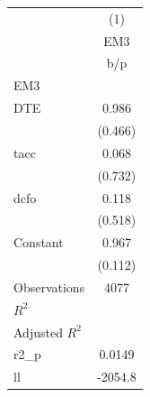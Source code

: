 {
\def\sym#1{\ifmmode^{#1}\else\(^{#1}\)\fi}
\begin{tabular}{l*{1}{c}}
\hline\hline
                    &\multicolumn{1}{c}{(1)}\\
                    &\multicolumn{1}{c}{EM3}\\
                    &         b/p   \\
\hline
EM3                 &               \\
DTE                 &       0.986   \\
                    &     (0.466)   \\
tacc                &       0.068   \\
                    &     (0.732)   \\
dcfo                &       0.118   \\
                    &     (0.518)   \\
Constant            &       0.967   \\
                    &     (0.112)   \\
\hline
Observations        &        4077   \\
\(R^{2}\)           &               \\
Adjusted \(R^{2}\)  &               \\
r2\_p                &      0.0149   \\
ll                  &     -2054.8   \\
\hline\hline
\end{tabular}
}
